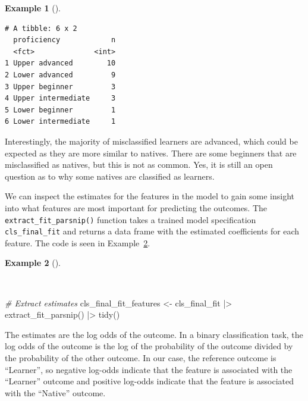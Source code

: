 \documentclass[
  letterpaper,
]{latex/krantz}
\newenvironment{Shaded}{\begin{snugshade}}{\end{snugshade}}
\newcommand{\CommentTok}[1]{\textcolor[rgb]{0.00,0.00,0.00}{\textit{#1}}}
\newcommand{\FunctionTok}[1]{\textcolor[rgb]{0.00,0.00,0.00}{#1}}
\newcommand{\NormalTok}[1]{\textcolor[rgb]{0.00,0.00,0.00}{#1}}
\newcommand{\OtherTok}[1]{\textcolor[rgb]{0.00,0.00,0.00}{#1}}
\newcommand{\SpecialCharTok}[1]{\textcolor[rgb]{0.00,0.00,0.00}{#1}}
\theoremstyle{definition}
\newtheorem{example}{Example}[chapter]
\theoremstyle{remark}
\begin{document}
\begin{example}[]
\begin{verbatim}
# A tibble: 6 x 2
  proficiency            n
  <fct>              <int>
1 Upper advanced        10
2 Lower advanced         9
3 Upper beginner         3
4 Upper intermediate     3
5 Lower beginner         1
6 Lower intermediate     1
\end{verbatim}

\end{example}

Interestingly, the majority of misclassified learners are advanced,
which could be expected as they are more similar to natives. There are
some beginners that are misclassified as natives, but this is not as
common. Yes, it is still an open question as to why some natives are
classified as learners.

We can inspect the estimates for the features in the model to gain some
insight into what features are most important for predicting the
outcomes. The \texttt{extract\_fit\_parsnip()} function takes a trained
model specification \texttt{cls\_final\_fit} and returns a data frame
with the estimated coefficients for each feature. The code is seen in
Example~\ref{exm-predict-class-tune-hyperparameters-evaluate-test-estimates}.

\begin{example}[]\protect\hypertarget{exm-predict-class-tune-hyperparameters-evaluate-test-estimates}{}\label{exm-predict-class-tune-hyperparameters-evaluate-test-estimates}

~

\begin{Shaded}
\begin{Highlighting}[]
\CommentTok{\# Extract estimates}
\NormalTok{cls\_final\_fit\_features }\OtherTok{\textless{}{-}}
\NormalTok{  cls\_final\_fit }\SpecialCharTok{|\textgreater{}}
  \FunctionTok{extract\_fit\_parsnip}\NormalTok{() }\SpecialCharTok{|\textgreater{}}
  \FunctionTok{tidy}\NormalTok{()}
\end{Highlighting}
\end{Shaded}

\end{example}

The estimates are the log odds of the outcome. In a binary
classification task, the log odds of the outcome is the log of the
probability of the outcome divided by the probability of the other
outcome. In our case, the reference outcome is ``Learner'', so negative
log-odds indicate that the feature is associated with the ``Learner''
outcome and positive log-odds indicate that the feature is associated
with the ``Native'' outcome.
\end{document}
